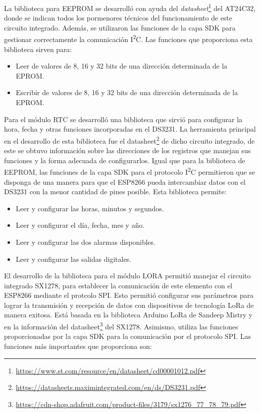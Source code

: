 La biblioteca para EEPROM se desarrolló con ayuda del \textit{datasheet}\footnote{\url{https://www.st.com/resource/en/datasheet/cd00001012.pdf}} del AT24C32, donde se indican todos los pormenores técnicos del funcionamiento de este circuito integrado. Además, se utilizaron las funciones de la capa SDK para gestionar correctamente la comunicación I\textsuperscript{2}C. Las funciones que proporciona esta biblioteca sirven para:

\begin{itemize}
	\item Leer de valores de 8, 16 y 32 bits de una dirección determinada de la EPROM.
	\item Escribir de valores de 8, 16 y 32 bits de una dirección determinada de la EPROM.
\end{itemize}

Para el módulo RTC se desarrolló una biblioteca que sirvió para configurar la hora, fecha y otras funciones incorporadas en el DS3231. La herramienta principal en el desarrollo de esta biblioteca fue el datasheet\footnote{\url{https://datasheets.maximintegrated.com/en/ds/DS3231.pdf}} de dicho circuito integrado, de este se obtuvo información sobre las direcciones de los registros que manejan sus funciones y la forma adecuada de configurarlos. Igual que para la biblioteca de EEPROM, las funciones de la capa SDK para el protocolo I\textsuperscript{2}C permitieron que se disponga de una manera para que el ESP8266 pueda intercambiar datos con el DS3231 con la menor cantidad de pines posible. Esta biblioteca permite:

\begin{itemize}
	\item Leer y configurar las horas, minutos y segundos.
	\item Leer y configurar el día, fecha, mes y año.
	\item Leer y configurar las dos alarmas disponibles.
	\item Leer y configurar las salidas digitales.
	
\end{itemize} 

El desarrollo de la biblioteca para el módulo LORA permitió manejar el circuito integrado SX1278, para establecer la comunicación de este elemento con el ESP8266 mediante el protcolo SPI. Esto permitió configurar sus parámetros para lograr la transmisión y recepción de datos con dispositivos de tecnología LoRa de manera exitosa. Está basada en la biblioteca Arduino LoRa de Sandeep Mistry \citep{WEBSITE:21} y en la información del datasheet\footnote{\url{https://cdn-shop.adafruit.com/product-files/3179/sx1276_77_78_79.pdf}} del SX1278. Asimismo, utiliza las funciones proporcionadas por la capa SDK para la comunicación por el protocolo SPI. Las funciones más importantes que proporciona son:


